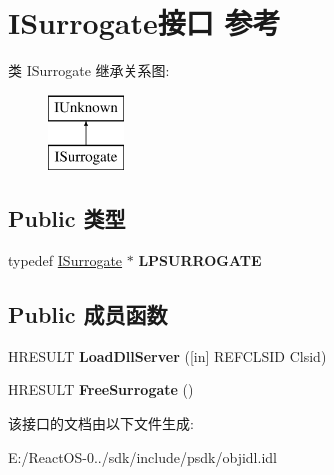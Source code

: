 \hypertarget{interface_i_surrogate}{}\section{I\+Surrogate接口 参考}
\label{interface_i_surrogate}
类 I\+Surrogate 继承关系图\+:\begin{figure}[H]
\begin{center}
\leavevmode
\includegraphics[height=2.000000cm]{interface_i_surrogate}
\end{center}
\end{figure}
\subsection*{Public 类型}
\begin{DoxyCompactItemize}
\item 
\mbox{\label{interface_i_surrogate_a7ea0b27e6b475a5c4a5c83da70ca0d76}} 
typedef \hyperlink{interface_i_surrogate}{I\+Surrogate} $\ast$ {\bfseries L\+P\+S\+U\+R\+R\+O\+G\+A\+TE}
\end{DoxyCompactItemize}
\subsection*{Public 成员函数}
\begin{DoxyCompactItemize}
\item 
\mbox{\label{interface_i_surrogate_aea76f708bde1a072b36ead77cd17eed2}} 
H\+R\+E\+S\+U\+LT {\bfseries Load\+Dll\+Server} (\mbox{[}in\mbox{]} R\+E\+F\+C\+L\+S\+ID Clsid)
\item 
\mbox{\label{interface_i_surrogate_a5f0e7c9160e68658994575a05e8424e3}} 
H\+R\+E\+S\+U\+LT {\bfseries Free\+Surrogate} ()
\end{DoxyCompactItemize}


该接口的文档由以下文件生成\+:\begin{DoxyCompactItemize}
\item 
E\+:/\+React\+O\+S-\/0../sdk/include/psdk/objidl.\+idl\end{DoxyCompactItemize}
